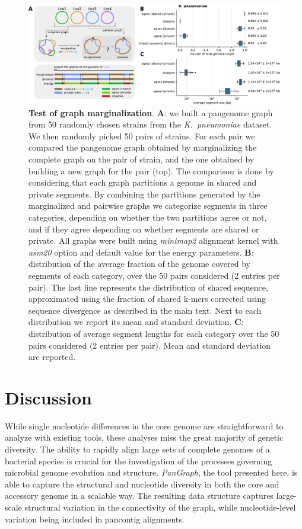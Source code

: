 \documentclass[aps,rmp,preprint,superscriptaddress,10pt,linenumbers]{revtex4-1}
\begin{document}
\begin{figure}[htb]
    \includegraphics[width=\textwidth]{figs/marginalize_test.pdf}
    \caption{{\bf Test of graph marginalization}.
        \textbf{A}: we built a pangenome graph from 50 randomly chosen strains from the \textit{K.~pneumoniae} dataset. We then randomly picked 50 pairs of strains. For each pair we compared the pangenome graph obtained by marginalizing the complete graph on the pair of strain, and the one obtained by building a new graph for the pair (top). The comparison is done by considering that each graph partitions a genome in shared and private segments. By combining the partitions generated by the marginalized and pairwise graphs we categorize segments in three categories, depending on whether the two partitions agree or not, and if they agree depending on whether segments are shared or private. All graphs were built using \textit{minimap2} alignment kernel with \textit{asm20} option and default value for the energy parameters.
        \textbf{B}: distribution of the average fraction of the genome covered by segments of each category, over the 50 pairs considered (2 entries per pair). The last line represents the distribution of shared sequence, approximated using the fraction of shared k-mers corrected using sequence divergence as described in the main text. Next to each distribution we report its mean and standard deviation.
        \textbf{C}: distribution of average segment lengths for each category over the 50 pairs considered (2 entries per pair). Mean and standard deviation are reported.
    }
    \label{fig:marginalization}
\end{figure}



\section{Discussion}

While single nucleotide differences in the core genome are straightforward to analyze with existing tools, these analyses miss the great majority of genetic diversity. The ability to rapidly align large sets of complete genomes of a bacterial species is crucial for the investigation of the processes governing microbial genome evolution and structure. \textit{PanGraph}, the tool presented here, is able to capture the structural and nucleotide diversity in both the core and accessory genome in a scalable way.
The resulting data structure captures large-scale structural variation in the connectivity of the graph, while nucleotide-level variation being included in pancontig alignments.
\end{document}
